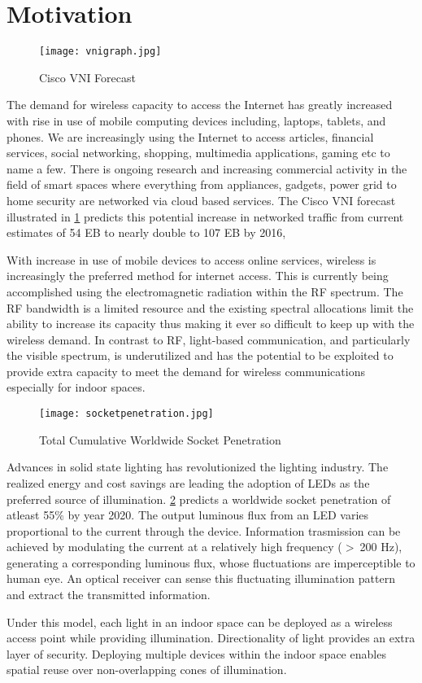 \section{Motivation}
\label{sec:motivation}
\graphicspath{{_Intro/Figures/}}

\begin{figure}[!b]
	\centering
		\texttt{[image: vnigraph.jpg]}
	\caption{Cisco VNI Forecast}
	\label{fig:vnigraph}
\end{figure}

The demand for wireless capacity to access the Internet has greatly increased with rise in use of mobile computing devices including, laptops, tablets, and phones. We are increasingly using the Internet to access articles, financial services, social networking, shopping, multimedia applications, gaming etc to name a few. There is ongoing research and increasing commercial activity in the field of smart spaces where everything from appliances, gadgets, power grid to home security are networked via cloud based services. The Cisco VNI forecast illustrated in \figurename{ \ref{fig:vnigraph}} predicts this potential increase in networked traffic from current estimates of 54 EB to nearly double to 107 EB by 2016,

With increase in use of mobile devices to access online services, wireless is increasingly the preferred method for internet access. This is currently being accomplished using the electromagnetic radiation within the RF spectrum. The RF bandwidth is a limited resource and the existing spectral allocations limit the ability to increase its capacity thus making it ever so difficult to keep up with the wireless demand. In contrast to RF, light-based communication, and particularly the visible spectrum, is underutilized and has the potential to be exploited to provide extra capacity to meet the demand for wireless communications especially for indoor spaces. 

\begin{figure}[!t]
	\centering
		\texttt{[image: socketpenetration.jpg]}
	\caption{Total Cumulative Worldwide Socket Penetration}
	\label{fig:socketpenetration}
\end{figure}

Advances in solid state lighting has revolutionized the lighting industry. The realized energy and cost savings are leading the adoption of LEDs as the preferred source of illumination. \figurename{ \ref{fig:socketpenetration}} \cite{bar11a} predicts a worldwide socket penetration of atleast 55$\%$ by year 2020. The output luminous flux from an LED varies proportional to the current through the device. Information trasmission can be achieved by modulating the current at a relatively high frequency ($>~$200 Hz), generating a corresponding luminous flux, whose fluctuations are imperceptible to human eye. An optical receiver can sense this fluctuating illumination pattern and extract the transmitted information.

Under this model, each light in an indoor space can be deployed as a wireless access point while providing illumination. Directionality of light provides an extra layer of security. Deploying multiple devices within the indoor space enables spatial reuse over non-overlapping cones of illumination.

